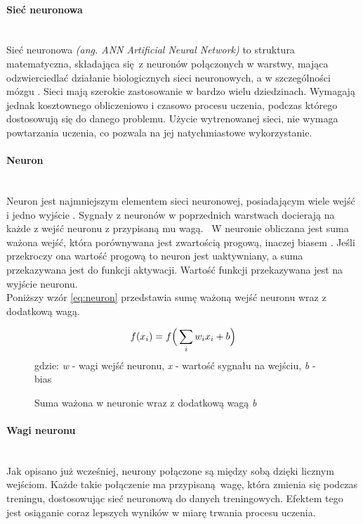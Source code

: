 \paragraph{Sieć neuronowa} \mbox{}\\
Sieć neuronowa \textit{(ang. ANN Artificial Neural Network)} to struktura matematyczna,
składająca się z neuronów połączonych w warstwy, mająca odzwierciedlać działanie
biologicznych sieci neuronowych, a w szczególności mózgu \cite{intuitiveExplanation, WIKIcnn}.
Sieci mają szerokie zastosowanie w bardzo wielu dziedzinach. Wymagają jednak kosztownego obliczeniowo i czasowo
procesu uczenia, podczas którego dostosowują się do danego problemu. Użycie wytrenowanej
sieci, nie wymaga powtarzania uczenia, co pozwala na jej natychmiastowe wykorzystanie.

\paragraph{Neuron} \mbox{}\\
Neuron jest najmniejszym elementem sieci neuronowej, posiadającym wiele wejść i jedno wyjście \cite{CS231n_activ, NNbiology, NeuronAnimation}.
Sygnały z neuronów w poprzednich warstwach docierają na każde z wejść neuronu z przypisaną mu wagą. 
W neuronie obliczana jest suma ważona wejść, która porównywana jest zwartością progową,
inaczej biasem \cite{needForBias}. Jeśli przekroczy ona wartość progową to neuron jest uaktywniany,
a suma przekazywana jest do funkcji aktywacji. Wartość funkcji przekazywana jest na wyjście neuronu.\\
Poniższy wzór \ref{eq:neuron} przedstawia sumę ważoną wejść neuronu wraz z dodatkową wagą.
\begin{figure}[h!]
\renewcommand{\figurename}{Wzór}%
\begin{equation} \label{eq:neuron}
f(x_{i}) = f\Big(\sum_{i}w_{i}x_{i} + b \Big)\\
\end{equation}\centering
gdzie: \textit{w} - wagi wejść neuronu, \textit{x} - wartość sygnału na wejściu, \textit{b} - bias
\caption{Suma ważona w neuronie wraz z dodatkową wagą \textit{b}}
\end{figure}

\paragraph{Wagi neuronu} \mbox{}\\
Jak opisano już wcześniej, neurony połączone są między sobą dzięki licznym wejściom.
Każde takie połączenie ma przypisaną wagę, która zmienia się podczas treningu,
dostosowując sieć neuronową do danych treningowych. Efektem tego jest osiąganie
coraz lepszych wyników w miarę trwania procesu uczenia.

